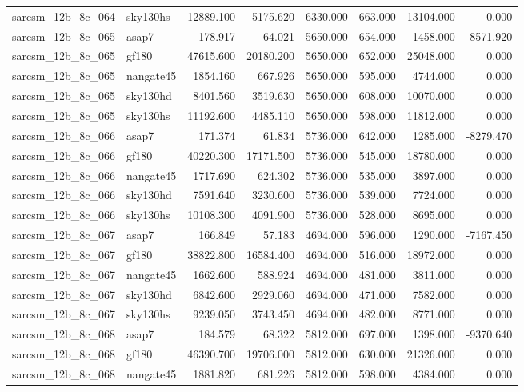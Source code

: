 \begin{tabular}{llrrrrrr}
sarcsm\_12b\_8c\_064 & sky130hs & 12889.100 & 5175.620 & 6330.000 & 663.000 & 13104.000 & 0.000 \\
sarcsm\_12b\_8c\_065 & asap7 & 178.917 & 64.021 & 5650.000 & 654.000 & 1458.000 & -8571.920 \\
sarcsm\_12b\_8c\_065 & gf180 & 47615.600 & 20180.200 & 5650.000 & 652.000 & 25048.000 & 0.000 \\
sarcsm\_12b\_8c\_065 & nangate45 & 1854.160 & 667.926 & 5650.000 & 595.000 & 4744.000 & 0.000 \\
sarcsm\_12b\_8c\_065 & sky130hd & 8401.560 & 3519.630 & 5650.000 & 608.000 & 10070.000 & 0.000 \\
sarcsm\_12b\_8c\_065 & sky130hs & 11192.600 & 4485.110 & 5650.000 & 598.000 & 11812.000 & 0.000 \\
sarcsm\_12b\_8c\_066 & asap7 & 171.374 & 61.834 & 5736.000 & 642.000 & 1285.000 & -8279.470 \\
sarcsm\_12b\_8c\_066 & gf180 & 40220.300 & 17171.500 & 5736.000 & 545.000 & 18780.000 & 0.000 \\
sarcsm\_12b\_8c\_066 & nangate45 & 1717.690 & 624.302 & 5736.000 & 535.000 & 3897.000 & 0.000 \\
sarcsm\_12b\_8c\_066 & sky130hd & 7591.640 & 3230.600 & 5736.000 & 539.000 & 7724.000 & 0.000 \\
sarcsm\_12b\_8c\_066 & sky130hs & 10108.300 & 4091.900 & 5736.000 & 528.000 & 8695.000 & 0.000 \\
sarcsm\_12b\_8c\_067 & asap7 & 166.849 & 57.183 & 4694.000 & 596.000 & 1290.000 & -7167.450 \\
sarcsm\_12b\_8c\_067 & gf180 & 38822.800 & 16584.400 & 4694.000 & 516.000 & 18972.000 & 0.000 \\
sarcsm\_12b\_8c\_067 & nangate45 & 1662.600 & 588.924 & 4694.000 & 481.000 & 3811.000 & 0.000 \\
sarcsm\_12b\_8c\_067 & sky130hd & 6842.600 & 2929.060 & 4694.000 & 471.000 & 7582.000 & 0.000 \\
sarcsm\_12b\_8c\_067 & sky130hs & 9239.050 & 3743.450 & 4694.000 & 482.000 & 8771.000 & 0.000 \\
sarcsm\_12b\_8c\_068 & asap7 & 184.579 & 68.322 & 5812.000 & 697.000 & 1398.000 & -9370.640 \\
sarcsm\_12b\_8c\_068 & gf180 & 46390.700 & 19706.000 & 5812.000 & 630.000 & 21326.000 & 0.000 \\
sarcsm\_12b\_8c\_068 & nangate45 & 1881.820 & 681.226 & 5812.000 & 598.000 & 4384.000 & 0.000 \\

\end{tabular}
